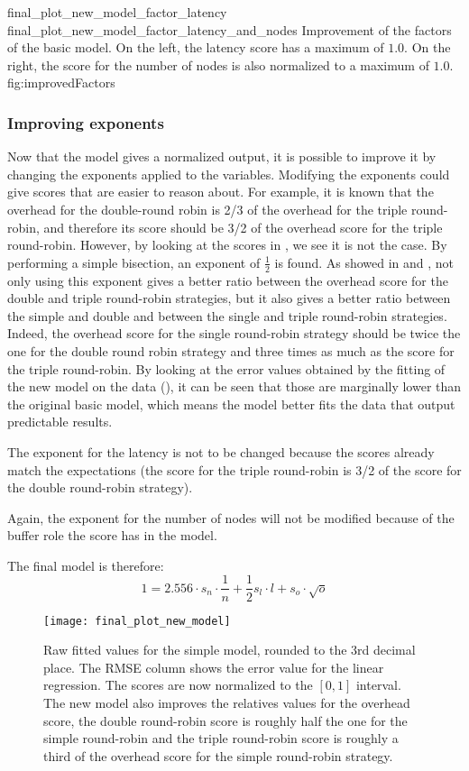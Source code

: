 \doublefigure
    {final_plot_new_model_factor_latency}
    {final_plot_new_model_factor_latency_and_nodes}
    {Improvement of the factors of the basic model. On the left, the latency
    score has a maximum of \(1.0\). On the right, the score for the number of nodes
    is also normalized to a maximum of \(1.0\).}
    {fig:improvedFactors}


\subsubsection{Improving exponents}
Now that the model gives a normalized output, it is possible to improve it by
changing the exponents applied to the variables. Modifying the exponents could
give scores that are easier to reason about. For example, it is known that the
overhead for the double-round robin is 2/3 of the overhead for the triple
round-robin, and therefore its score should be 3/2 of the overhead score for the
triple round-robin. However, by looking at the scores in ,
we see it is not the case.
By performing a simple bisection, an exponent of \(\frac{1}{2}\) is found. As
showed in  and , not only
using this exponent gives a better ratio between the overhead score for the
double and triple round-robin strategies, but it also gives a better ratio
between the simple and double and between the single and triple round-robin
strategies. Indeed, the overhead score for the single round-robin strategy
should be twice the one for the double round robin strategy and three times as
much as the score for the triple round-robin.  By looking at the error values
obtained by the fitting of the new model on the data
(), it can be seen that those are marginally lower than
the original basic model, which means the model better fits the data that output
predictable results. 

The exponent for the latency is not to be changed because the scores already
match the expectations (the score for the triple round-robin is 3/2 of the score
for the double round-robin strategy). 

Again, the exponent for the number of nodes will not be modified because of the
buffer role the score has in the model.

The final model is therefore: 
\[1 = 2.556\cdot s_n \cdot \frac{1}{n} + \frac{1}{2} s_l\cdot l + s_o\cdot
\sqrt{o}\]

\begin{figure}[h]
    \centering
    \texttt{[image: final\_plot\_new\_model]}
    \caption{Raw fitted values for the simple model, rounded to the 3rd
        decimal place. The RMSE column shows the error value for the linear
        regression. The scores are now normalized to the \([0, 1]\)
        interval. The new model also improves the relatives values for the
        overhead score, the double round-robin score is roughly half the one for
        the simple round-robin and the triple round-robin score is roughly a
        third of the overhead score for the simple round-robin strategy.}
    \label{fig:recapTestsPlotNew}
\end{figure}

